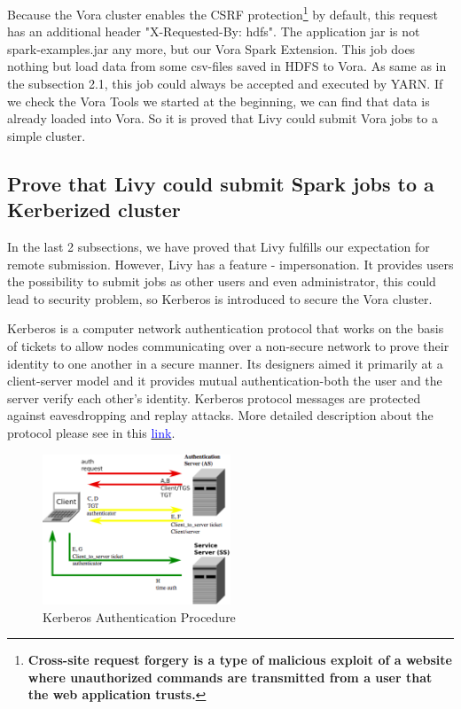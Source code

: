 \documentclass[article,colorback,accentcolor=tud4c]{tudreport}
\begin{document}
	Because the Vora cluster enables the CSRF protection\footnote{\textbf{Cross-site request forgery is a type of malicious exploit of a website where unauthorized commands are transmitted from a user that the web application trusts.}} by default, this request has an additional header "X-Requested-By: hdfs". The application jar is not spark-examples.jar any more, but our Vora Spark Extension. This job does nothing but load data from some csv-files saved in HDFS to Vora. As same as in the subsection 2.1, this job could always be accepted and executed by YARN. If we check the Vora Tools we started at the beginning, we can find that data is already loaded into Vora. So it is proved that Livy could submit Vora jobs to a simple cluster.
		
	\subsection{Prove that Livy could submit Spark jobs to a Kerberized cluster}
	
	In the last 2 subsections, we have proved that Livy fulfills our expectation for remote submission. However, Livy has a feature - impersonation. It provides users the possibility to submit jobs as other users and even administrator, this could lead to security problem, so Kerberos is introduced to secure the Vora cluster.
	
	Kerberos is a computer network authentication protocol that works on the basis of tickets to allow nodes communicating over a non-secure network to prove their identity to one another in a secure manner. Its designers aimed it primarily at a client-server model and it provides mutual authentication-both the user and the server verify each other's identity. Kerberos protocol messages are protected against eavesdropping and replay attacks. More detailed description about the protocol please see in this \href{https://en.wikipedia.org/wiki/Kerberos_(protocol)#Description}{\textcolor{blue}{link}}.
	
	\begin{figure}[!h]
		\centering
		\includegraphics[width=0.5\textwidth]{Kerberos}
		\caption{Kerberos Authentication Procedure}
	\end{figure}
	
\end{document}
